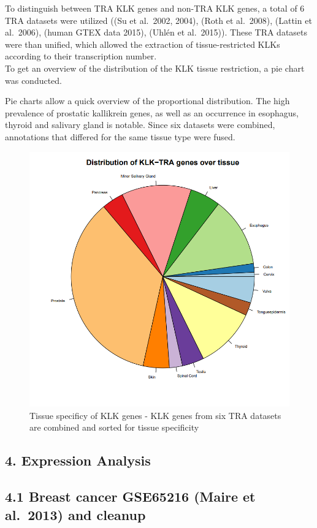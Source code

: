 \documentclass[
]{article}
\begin{document}
To distinguish between TRA KLK genes and non-TRA KLK genes, a total of 6
TRA datasets were utilized ((Su et al.~2002, 2004), (Roth et al.~2008),
(Lattin et al.~2006), (human GTEX data 2015), (Uhlén et al.~2015)).
These TRA datasets were than unified, which allowed the extraction of
tissue-restricted KLKs according to their transcription number.\\
To get an overview of the distribution of the KLK tissue restriction, a
pie chart was conducted.

Pie charts allow a quick overview of the proportional distribution. The
high prevalence of prostatic kallikrein genes, as well as an occurrence
in esophagus, thyroid and salivary gland is notable. Since six datasets
were combined, annotations that differed for the same tissue type were
fused.

\begin{figure}

{\centering \includegraphics[width=0.5\linewidth]{images/piechart_TRA} 

}

\caption{Tissue specificy of KLK genes - KLK genes from six TRA datasets are combined and sorted for tissue specificity}\label{fig:TRA -piechart}
\end{figure}

\hypertarget{expression-analysis}{%
\subsection{4. Expression Analysis}\label{expression-analysis}}

\hypertarget{breast-cancer-gse65216-maire-et-al.-2013-and-cleanup}{%
\subsection{4.1 Breast cancer GSE65216 (Maire et al.~2013) and
cleanup}\label{breast-cancer-gse65216-maire-et-al.-2013-and-cleanup}}
\end{document}
